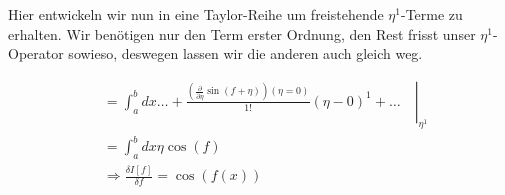 \documentclass[a4paper,german,12pt,smallheadings]{scrartcl}
\begin{document}
Hier entwickeln wir nun in eine Taylor-Reihe um freistehende $\eta^1$-Terme zu
erhalten. Wir benötigen nur den Term erster Ordnung, den Rest frisst unser
$\eta^1$-Operator sowieso, deswegen lassen wir die anderen auch gleich weg.

\begin{align*}
  &=\left.\int_a^b dx \dots + \frac{\left(\frac{\partial}{\partial \eta} \sin(f+\eta)\right)(\eta=0)}{1!} (\eta - 0)^1 + \dots\quad\right|_{\eta^1} \\
  &=\int_a^b dx \eta \cos(f) \\
  &\Rightarrow \frac{\delta I[f]}{\delta f} = \cos(f(x))
\end{align*}
\end{document}
